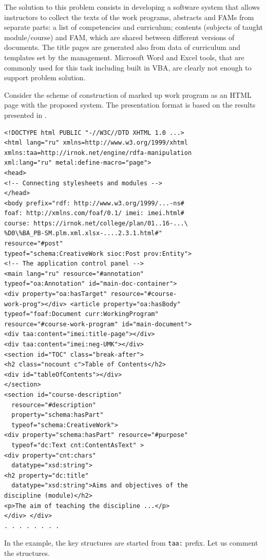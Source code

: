 \documentclass[conference,a4paper]{IEEEtran}
\begin{document}
The solution to this problem consists in developing a software system that allows instructors to collect the texts of the work programs, abstracts and FAMs from separate parts: a list of competencies and curriculum; contents (subjects of taught module/course) and FAM, which are shared between different versions of documents.  The title pages are generated also from data of curriculum and templates set by the management.  Microsoft Word and Excel tools, that are commonly used for this task including built in VBA, are clearly not enough to support problem solution.

Consider the scheme of construction of marked up work program as an HTML page with the proposed system.  The presentation format is based on the results presented in \cite{b4,c6}.

\begin{verbatim}
<!DOCTYPE html PUBLIC "-//W3C//DTD XHTML 1.0 ...>
<html lang="ru" xmlns=http://www.w3.org/1999/xhtml
xmlns:taa=http://irnok.net/engine/rdfa-manipulation
xml:lang="ru" metal:define-macro="page">
<head>
<!-- Connecting stylesheets and modules -->
</head>
<body prefix="rdf: http://www.w3.org/1999/...-ns#
foaf: http://xmlns.com/foaf/0.1/ imei: imei.html#
course: https://irnok.net/college/plan/01..16-...\
%D0\%BA_PB-SM.plm.xml.xlsx-....2.3.1.html#"
resource="#post"
typeof="schema:CreativeWork sioc:Post prov:Entity">
<!-- The application control panel -->
<main lang="ru" resource="#annotation"
typeof="oa:Annotation" id="main-doc-container">
<div property="oa:hasTarget" resource="#course-
work-prog"></div> <article property="oa:hasBody"
typeof="foaf:Document curr:WorkingProgram"
resource="#course-work-program" id="main-document">
<div taa:content="imei:title-page"></div>
<div taa:content="imei:neg-UMK"></div>
<section id="TOC" class="break-after">
<h2 class="nocount c">Table of Contents</h2>
<div id="tableOfContents"></div>
</section>
<section id="course-description"
  resource="#description"
  property="schema:hasPart"
  typeof="schema:CreativeWork">
<div property="schema:hasPart" resource="#purpose"
  typeof="dc:Text cnt:ContentAsText" >
<div property="cnt:chars"
  datatype="xsd:string">
<h2 property="dc:title"
  datatype="xsd:string">Aims and objectives of the
discipline (module)</h2>
<p>The aim of teaching the discipline ...</p>
</div> </div>
. . . . . . . .
\end{verbatim}

In the example, the key structures are started from \texttt{taa:} prefix. Let us comment the structures.
\end{document}
